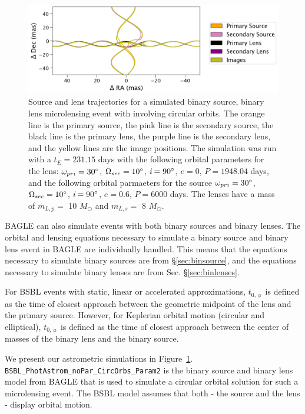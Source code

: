 \documentclass[twocolumn]{aastex701}
\newcommand{\tnot}{t_{0,\sun}}
\newcommand{\w}{\omega_{pri}}
\newcommand{\bigomega}{\Omega_{sec}}
\newcommand{\inclination}{\textit{i}}
\newcommand{\period}{\textit{P}}
\begin{document}
\begin{figure}
    \centering
    \includegraphics[width= \textwidth] {figures/bsbl_keplerian.png}
    \caption{Source and lens trajectories for a simulated binary source, binary lens microlensing event with  involving circular orbits. The orange line is the primary source, the pink line is the secondary source, the black line is the primary lens, the purple line is the secondary lens, and the yellow lines are the image positions. The simulation was run with a $t_E = 231.15$ days with the following orbital parameters for the lens: $\w = 30 \degree$, $\bigomega = 10 \degree$, $\inclination = 90 \degree$, $e=0$, $\period = 1948.04 $ days, and the following orbital parmaeters for the source $\w = 30 \degree$, $\bigomega = 10 \degree$, $\inclination = 90 \degree$, $e=0.6$, $\period = 6000 $ days. The lenses have a mass of $m_{L,p}=$ 10 $M_\odot$ and $m_{L,s}=$ 8 $M_\odot$.}
    \label{fig:bsbl_keplerian}
\end{figure}


 BAGLE can also simulate events with both binary sources and binary lenses. The orbital and lensing equations necessary to simulate a binary source and binary lens event in BAGLE are individually handled. This means that the equations necessary to simulate binary sources are from \S\ref{sec:binsource}, and the equations necessary to simulate binary lenses are from Sec. \S\ref{sec:binlenses}.

For BSBL events with static, linear or accelerated approximations, $\tnot$ is defined as the time of closest approach between the geometric midpoint of the lens and the primary source. However, for Keplerian orbital motion (circular and elliptical), $\tnot$ is defined as the time of closest approach between the center of masses of the binary lens and the binary source. 

We present our astrometric simulations in Figure~\ref{fig:bsbl_keplerian}. \texttt{BSBL\_PhotAstrom\_noPar\_CircOrbs\_Param2} is the binary source and binary lens model from BAGLE that is used to simulate a circular orbital solution for such a microlensing event. The BSBL model assumes that both - the source and the lens - display orbital motion. 
\end{document}
